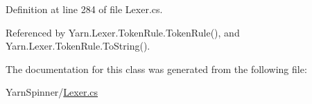Definition at line 284 of file Lexer.\-cs.



Referenced by Yarn.\-Lexer.\-Token\-Rule.\-Token\-Rule(), and Yarn.\-Lexer.\-Token\-Rule.\-To\-String().



The documentation for this class was generated from the following file\-:\begin{DoxyCompactItemize}
\item 
Yarn\-Spinner/\hyperlink{a00298}{Lexer.\-cs}\end{DoxyCompactItemize}
